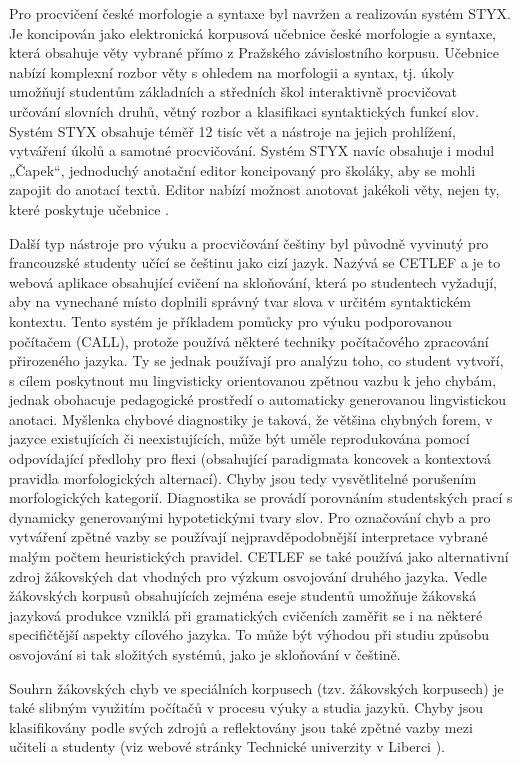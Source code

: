 \begin{multicols}{2}
Pro procvičení české morfologie a syntaxe byl navržen a realizován systém STYX. Je koncipován jako elektronická korpusová učebnice české morfologie a syntaxe, která obsahuje věty vybrané přímo z Pražského závislostního korpusu. Učebnice nabízí komplexní rozbor věty s ohledem na morfologii a syntax, tj. úkoly umožňují studentům základních a středních škol interaktivně procvičovat určování slovních druhů, větný rozbor a klasifikaci syntaktických funkcí slov. Systém STYX obsahuje téměř 12 tisíc vět a nástroje na jejich prohlížení, vytváření úkolů a samotné procvičování. Systém STYX navíc obsahuje i  modul „Čapek“, jednoduchý anotační editor koncipovaný pro školáky, aby se mohli zapojit do anotací textů. Editor nabízí možnost anotovat jakékoli věty, nejen ty, které poskytuje učebnice \cite{Note8}.

Další typ nástroje pro výuku a procvičování češtiny byl původně vyvinutý pro francouzské studenty učící se češtinu jako cizí jazyk. Nazývá se CETLEF \cite{Note9} a je to webová aplikace obsahující cvičení na skloňování, která po studentech vyžadují, aby na vynechané místo doplnili správný tvar slova v určitém syntaktickém kontextu. Tento systém je příkladem pomůcky pro výuku podporovanou počítačem (CALL), protože používá některé techniky počítačového zpracování přirozeného jazyka. Ty se jednak používají pro analýzu toho, co student vytvoří, s cílem poskytnout mu lingvisticky orientovanou zpětnou vazbu k jeho chybám, jednak obohacuje pedagogické prostředí o automaticky generovanou lingvistickou anotaci. Myšlenka chybové diagnostiky je taková, že většina chybných forem, v jazyce existujících či neexistujících, může být uměle reprodukována pomocí odpovídající předlohy pro flexi (obsahující paradigmata koncovek a kontextová pravidla morfologických alternací). Chyby jsou tedy vysvětlitelné porušením morfologických kategorií. Diagnostika se provádí porovnáním studentských prací s dynamicky generovanými hypotetickými tvary slov. Pro označování chyb a pro vytváření zpětné vazby se používají nejpravděpodobnější interpretace vybrané malým počtem heuristických pravidel. CETLEF se také používá jako alternativní zdroj žákovských dat vhodných pro výzkum osvojování druhého jazyka. Vedle žákovských korpusů obsahujících zejména eseje studentů umožňuje žákovská jazyková produkce vzniklá při gramatických cvičeních zaměřit se i na některé specifičtější aspekty cílového jazyka. To může být výhodou při studiu způsobu osvojování si tak složitých systémů, jako je skloňování v češtině.

Souhrn žákovských chyb ve speciálních korpusech (tzv. žákovských korpusech) je také slibným využitím počítačů v procesu výuky a studia jazyků. Chyby jsou klasifikovány podle svých zdrojů a reflektovány jsou také zpětné vazby mezi učiteli a studenty (viz webové stránky Technické univerzity v Liberci \cite{Note10}).


\end{multicols}
